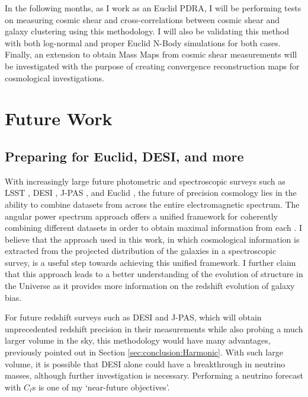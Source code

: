 \qquad In the following months, as I work as an Euclid PDRA, I will be performing tests on measuring cosmic shear and cross-correlations between cosmic shear and galaxy clustering using this methodology. I will also be validating this method with both log-normal and proper Euclid N-Body simulations for both cases.  Finally, an extension to obtain Mass Maps from cosmic shear measurements will be investigated with the purpose of creating convergence reconstruction maps for cosmological investigations.

\section{Future Work} 
\subsection{Preparing for Euclid, DESI, and more}
\label{sec:conclusion:future}
With increasingly large future photometric and spectroscopic surveys such as LSST \citep{2012arXiv1211.0310L}, DESI \citep{2016-DESI}, J-PAS \citep{JPAS}, and Euclid \citep{2011EuclidRedPaper}, the future of precision cosmology lies in the ability to combine datasets from across the entire electromagnetic spectrum. The angular power spectrum approach offers a unified framework for coherently combining different datasets in order to obtain maximal information from each \citep{JoachimiBridle2010,Kirk2015,2016McLeod}. I believe that the approach used in this work, in which cosmological information is extracted from the projected distribution of the galaxies in a spectroscopic survey, is a useful step towards achieving this unified framework. I further claim that this approach leads to a better understanding of the evolution of structure in the Universe as it provides more information on the redshift evolution of galaxy bias.

\qquad For future redshift surveys such as DESI and J-PAS, which will obtain unprecedented redshift precision in their measurements while also probing a much larger volume in the sky, this methodology would have many advantages, previously pointed out in Section \ref{sec:conclusion:Harmonic}. With such large volume, it is possible that DESI alone could have a breakthrough in neutrino masses, although further investigation is necessary. Performing a neutrino forecast with $C_{\ell}$s is one of my `near-future objectives'.

